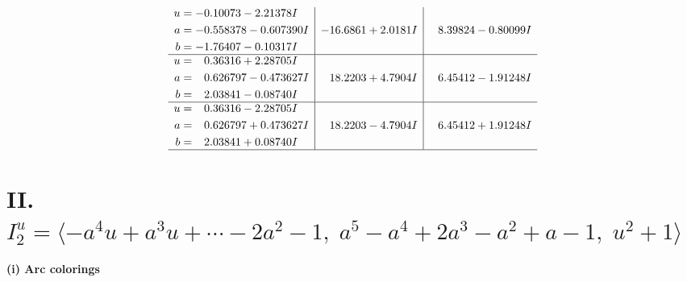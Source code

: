 \documentclass[1p]{elsarticle_modified}
\theoremstyle{definition}
\begin{document}
$$\begin{array}{c|c|c}
\begin{aligned}
u &= -0.10073 - 2.21378 I \\
a &= -0.558378 - 0.607390 I \\
b &= -1.76407 - 0.10317 I\end{aligned}
 & -16.6861 + 2.0181 I & \phantom{-}8.39824 - 0.80099 I \\ \hline\begin{aligned}
u &= \phantom{-}0.36316 + 2.28705 I \\
a &= \phantom{-}0.626797 - 0.473627 I \\
b &= \phantom{-}2.03841 - 0.08740 I\end{aligned}
 & \phantom{-}18.2203 + 4.7904 I & \phantom{-}6.45412 - 1.91248 I \\ \hline\begin{aligned}
u &= \phantom{-}0.36316 - 2.28705 I \\
a &= \phantom{-}0.626797 + 0.473627 I \\
b &= \phantom{-}2.03841 + 0.08740 I\end{aligned}
 & \phantom{-}18.2203 - 4.7904 I & \phantom{-}6.45412 + 1.91248 I\\
 \hline 
 \end{array}$$\newpage\newpage\renewcommand{\arraystretch}{1}
\centering \section*{II. $I^u_{2}= \langle - a^4 u+a^3 u+\cdots-2 a^2-1,\;a^5- a^4+2 a^3- a^2+a-1,\;u^2+1 \rangle$}
\flushleft \textbf{(i) Arc colorings}\\
\end{document}
